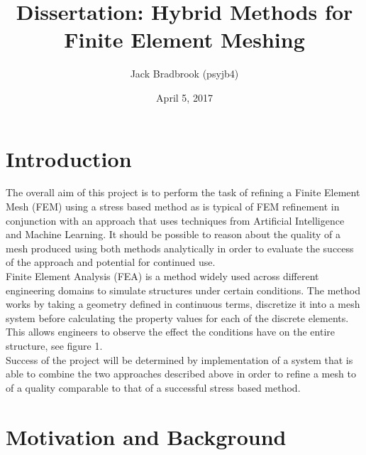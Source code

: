 \documentclass{article}
\begin{document}

\title{Dissertation: Hybrid Methods for Finite Element Meshing}
\author{Jack Bradbrook (psyjb4)}
\date{April 5, 2017}
\maketitle

\tableofcontents

\newpage

\section{Introduction}

The overall aim of this project is to perform the task of refining a Finite Element Mesh (FEM) using a stress based method as is typical of FEM refinement in conjunction with an approach that uses techniques from Artificial Intelligence and Machine Learning. It should be possible to reason about the quality of a mesh produced using both methods analytically in order to evaluate the success of the approach and potential for continued use.\\

\noindent
Finite Element Analysis (FEA) is a method widely used across different engineering domains to simulate structures under certain conditions. The method works by taking a geometry defined in continuous terms, discretize it into a mesh system before calculating the property values for each of the discrete elements. This allows engineers to observe the effect the conditions have on the entire structure, see figure 1. \\ 

\noindent
Success of the project will be determined by implementation of a system that is able to combine the two approaches described above in order to refine a mesh to of a quality comparable to that of a successful stress based method.


\section{Motivation and Background}
\end{document}
